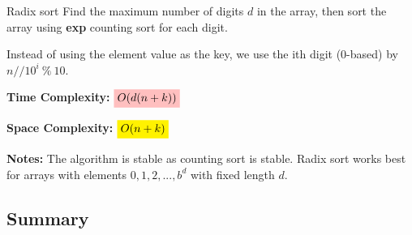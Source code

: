\begin{definition}
    {Radix sort}
    Find the maximum number of digits $d$ in the array, then sort the array using \textbf{exp} counting sort for each digit.

    Instead of using the element value as the key, we use the ith digit (0-based) by $n // 10^i\ \%\ 10$.

    \textbf{Time Complexity:} $\mathcolorbox{pink}{O(d(n+k))}$

    \textbf{Space Complexity:} $\mathcolorbox{yellow}{O(n+k)}$

    \textbf{Notes:} The algorithm is stable as counting sort is stable. Radix sort works best for arrays with elements ${0,1,2,...,b^d}$ with fixed length $d$.
\end{definition}

\subsection{Summary}

